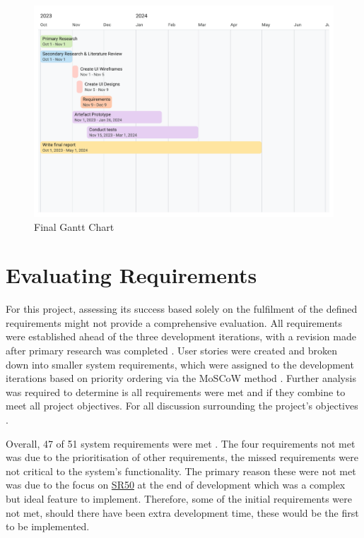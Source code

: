 \begin{figure}[h!]
    \centering
    \includegraphics[width=1\linewidth]{figures/Actual FYP Gantt.pdf}
    \caption{Final Gantt Chart}
    \label{fig:final-gantt}
\end{figure}

\clearpage
\section{Evaluating Requirements}
\label{evaluation:requirements}

For this project, assessing its success based solely on the fulfilment of the defined requirements might not provide a comprehensive evaluation. All requirements were established ahead of the three development iterations, with a revision made after primary research was completed . User stories were created and broken down into smaller system requirements, which were assigned to the development iterations based on priority ordering via the MoSCoW method . Further analysis was required to determine is all requirements were met and if they combine to meet all project objectives. For all discussion surrounding the project's objectives .

Overall, 47 of 51 system requirements were met . The four requirements not met was due to the prioritisation of other requirements, the missed requirements were not critical to the system's functionality. The primary reason these were not met was due to the focus on \hyperref[SR:50]{SR50} at the end of development which was a complex but ideal feature to implement. Therefore, some of the initial requirements were not met, should there have been extra development time, these would be the first to be implemented.

